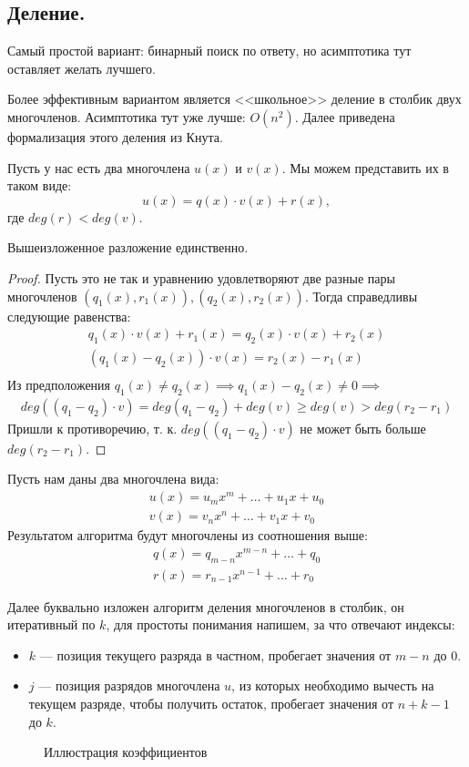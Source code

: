 \subsection{Деление.}
Самый простой вариант: бинарный поиск по ответу, но асимптотика тут оставляет желать лучшего.

Более эффективным вариантом является <<школьное>> деление в столбик двух многочленов. 
Асимптотика тут уже лучше: $O(n^2)$. Далее приведена формализация этого деления из Кнута.

Пусть у нас есть два многочлена $u(x)$ и $v(x)$. Мы можем представить их в таком виде:
\[
  u(x) = q(x) \cdot v(x) + r(x)
,\] 
где $deg(r) < deg(v)$.
\begin{remark}
  Вышеизложенное разложение единственно.
\end{remark}
\begin{proof}
  Пусть это не так и уравнению удовлетворяют две разные пары многочленов $(q_1(x), r_1(x)), (q_2(x), r_2(x))$.
  Тогда справедливы следующие равенства:
  \begin{gather*}
    q_1(x) \cdot v(x) + r_1(x) = q_2(x) \cdot v(x) + r_2(x) \\
    (q_1(x) - q_2(x)) \cdot v(x) = r_2(x) - r_1(x) \\
  \end{gather*}
  Из предположения $q_1(x) \neq q_2(x) \implies q_1(x) - q_2(x) \neq 0 \implies$
  \begin{gather*}
    deg((q_1 - q_2) \cdot v) = deg(q_1 - q_2) + deg(v) \geq deg(v) > deg(r_2 - r_1)
  \end{gather*}
  Пришли к противоречию, т. к. $deg((q_1 - q_2) \cdot v)$ не может быть больше $deg(r_2 - r_1)$.
\end{proof}

Пусть нам даны два многочлена вида:
\begin{gather*}
  u(x) = u_{m} x^{m} + \ldots + u_1 x + u_0 \\
  v(x) = v_{n} x^{n} + \ldots + v_1 x + v_0
\end{gather*}
Результатом алгоритма будут многочлены из соотношения выше:
\begin{gather*}
  q(x) = q_{m-n} x^{m-n} + \ldots + q_0 \\
  r(x) = r_{n-1} x^{n-1} + \ldots + r_0
\end{gather*}



Далее буквально изложен алгоритм деления многочленов в столбик, он итеративный по $k$, 
для простоты понимания напишем, за что отвечают индексы:
\begin{itemize}
  \item $k$ --- позиция текущего разряда в частном, пробегает значения от $m - n$ до $0$.
  \item $j$ --- позиция разрядов многочлена $u$, из которых необходимо вычесть на текущем разряде,
    чтобы получить остаток, пробегает значения от $n + k - 1$ до $k$.
\end{itemize}
\begin{figure}[ht]
    \centering
    \caption*{Иллюстрация коэффициентов}
    \label{fig:poly}
\end{figure}

